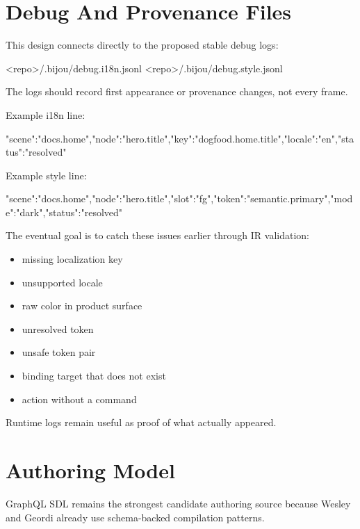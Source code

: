 \section{Debug And Provenance Files}\label{record-138-debug-and-provenance-files}

This design connects directly to the proposed stable debug logs:

\begin{CodeBlock}
<repo>/.bijou/debug.i18n.jsonl
<repo>/.bijou/debug.style.jsonl
\end{CodeBlock}

The logs should record first appearance or provenance changes, not every frame.

Example i18n line:

\begin{CodeBlock}
{"scene":"docs.home","node":"hero.title","key":"dogfood.home.title","locale":"en","status":"resolved"}
\end{CodeBlock}

Example style line:

\begin{CodeBlock}
{"scene":"docs.home","node":"hero.title","slot":"fg","token":"semantic.primary","mode":"dark","status":"resolved"}
\end{CodeBlock}

The eventual goal is to catch these issues earlier through IR validation:

\begin{itemize}
\tightlist
\item
  missing localization key
\item
  unsupported locale
\item
  raw color in product surface
\item
  unresolved token
\item
  unsafe token pair
\item
  binding target that does not exist
\item
  action without a command
\end{itemize}

Runtime logs remain useful as proof of what actually appeared.

\section{Authoring Model}\label{record-138-authoring-model}

GraphQL SDL remains the strongest candidate authoring source because Wesley and Geordi already use schema-backed compilation patterns.


